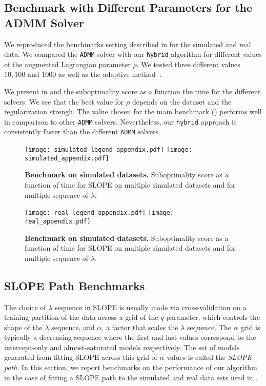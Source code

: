 \subsection{Benchmark with Different Parameters for the ADMM Solver}
\label{sec:admm-benchmarks}

We reproduced the benchmarks setting described in  for the simulated and real data.
We compared the \texttt{ADMM} solver with our \texttt{hybrid} algorithm for different values of the augmented Lagrangian parameter $\rho$.
We tested three different values $10, 100$ and $1000$ as well as the adaptive method~\parencite[Sec. 3.4.1]{boyd2010}.

We present in  and  the suboptimality score as a function the time for the different solvers.
We see that the best value for $\rho$ depends on the dataset and the regularization strengh.
The value chosen for the main benchmark () performs well in comparison to other \texttt{ADMM} solvers.
Nevertheless, our \texttt{hybrid} approach is consistently faster than the different  \texttt{ADMM} solvers.

\begin{figure*}[!t]
  \centering
  \texttt{[image: simulated\_legend\_appendix.pdf]}
  \texttt{[image: simulated\_appendix.pdf]}
  \caption{\textbf{Benchmark on simulated datasets.} Suboptimality score as a function of time for SLOPE on multiple simulated datasets and for multiple sequence of $\lambda$.}
  \label{fig:simulated_appendix}
\end{figure*}


\begin{figure*}[!t]
  \centering
  \texttt{[image: real\_legend\_appendix.pdf]}
  \texttt{[image: real\_appendix.pdf]}
  \caption{\textbf{Benchmark on simulated datasets.} Suboptimality score as a function of time for SLOPE on multiple simulated datasets and for multiple sequence of $\lambda$.}
  \label{fig:real_appendix}
\end{figure*}

\subsection{SLOPE Path Benchmarks}
\label{sec:slope-path-benchmarks}

The choice of \(\lambda\) sequence in SLOPE is usually made via cross-validation on a training partition of the data across a grid of the \(q\) parameter, which controls the shape of the \(\lambda\) sequence, and \(\alpha\), a factor that scales the \(\lambda\) sequence.
The \(\alpha\) grid is typically a decreasing sequence where the first and last values correspond to the intercept-only and almost-saturated models respectively.
The set of models generated from fitting SLOPE across this grid of \(\alpha\) values is called the \emph{SLOPE path}. 
In this section, we report benchmarks on the performance of our algorithm in the case of fitting a SLOPE path to the simulated and real data sets used in .

